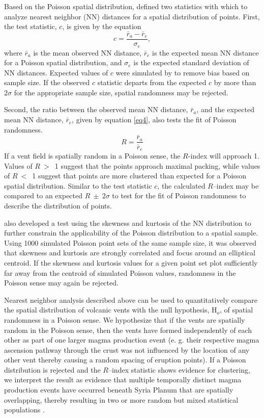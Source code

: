 Based on the Poisson spatial distribution, \citet{Clark1954} defined two statistics with which to analyze nearest neighbor (NN) distances for a spatial distribution of points. First, the test statistic, $c$, is given by the equation 
\begin{equation}
c= \frac{\bar{r}_a -\bar{r}_e}{\sigma_e},  \label{eq3}
\end{equation}
where $\bar{r}_a$ is the mean observed NN distance, $\bar{r}_e$ is the expected mean NN distance for a Poisson spatial distribution, and $\sigma_e$ is the expected standard deviation of NN distances. Expected values of $c$ were simulated by \citet{Baloga2007} to remove bias based on sample size. If the observed $c$ statistic departs from the expected $c$ by more than $2\sigma$ for the appropriate sample size, spatial randomness may be rejected.

Second, the ratio between the observed mean NN distance, $\bar{r}_a$, and the expected mean NN distance, $\bar{r}_e$, given by equation \ref{eq4}, also tests the fit of Poisson randomness.
\begin{equation}
R = \frac{\bar{r}_a}{\bar{r}_e} \label{eq4}
\end{equation}
If a vent field is spatially random in a Poisson sense, the $R$-index will approach 1. Values of $R~>$~1 suggest that the points approach maximal packing, while values of $R~<$~1 suggest that points are more clustered than expected for a Poisson spatial distribution. Similar to the test statistic $c$, the calculated $R$--index may be compared to an expected $R~\pm~2\sigma$ to test for the fit of Poisson randomness to describe the distribution of points.

\citet{Baloga2007} also developed a test using the skewness and kurtosis of the NN distribution to further constrain the applicability of the Poisson distribution to a spatial sample. Using 1000 simulated Poisson point sets of the same sample size, it was observed that skewness and kurtosis are strongly correlated and focus around an elliptical centroid.  If the skewness and kurtosis values for a given point set plot sufficiently far away from the centroid of simulated Poisson values, randomness in the Poisson sense may again be rejected.

Nearest neighbor analysis described above can be used to quantitatively compare the spatial distribution of volcanic vents with the null hypothesis, H$_o$, of spatial randomness in a Poisson sense. We hypothesize that if the vents are spatially random in the Poisson sense, then the vents have formed independently of each other as part of one larger magma production event (e. g. their respective magma ascension pathway through the crust was not influenced by the location of any other vent thereby causing a random spacing of eruption points). If a Poisson distribution is rejected and the $R$--index statistic shows evidence for clustering, we interpret the result as evidence that multiple temporally distinct magma production events have occurred beneath Syria Planum that are spatially overlapping, thereby resulting in two or more random but mixed statistical populations \citep{Lutz1986,lutz1995improved}.

